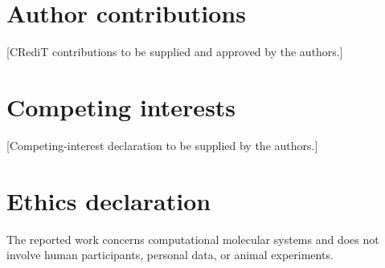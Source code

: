 \documentclass[11pt,a4paper]{article}
\begin{document}
\section*{Author contributions}
[CRediT contributions to be supplied and approved by the authors.]

\section*{Competing interests}
[Competing-interest declaration to be supplied by the authors.]

\section*{Ethics declaration}
The reported work concerns computational molecular systems and does not
involve human participants, personal data, or animal experiments.

\FloatBarrier

\appendix

\end{document}
